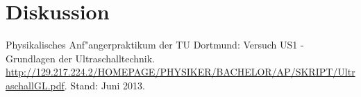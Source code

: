 \section{Diskussion}
\label{sec:diskussion}

\begin{thebibliography}{9}
	 Physikalisches Anf"angerpraktikum der TU Dortmund: Versuch US1 - Grundlagen der Ultraschalltechnik. \url{http://129.217.224.2/HOMEPAGE/PHYSIKER/BACHELOR/AP/SKRIPT/UltraschallGL.pdf}. Stand: Juni 2013.
\end{thebibliography}
